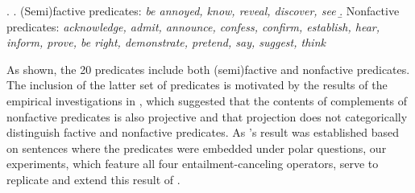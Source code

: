 \documentclass[a4paper,12pt,twoside]{article}
\newcommand{\poscite}[1]{\citeauthor{#1}'s \citeyear{#1}}
\begin{document}
    \ex. \label{ex:predicates}
    		\a. (Semi)factive predicates: {\em be annoyed, know, reveal, discover, see}
      \b. Nonfactive predicates: {\em acknowledge, admit, announce, confess, confirm, establish, hear, inform, prove, be right, demonstrate, pretend, say, suggest, think}
    
    As shown, the  20 predicates include both (semi)factive and nonfactive predicates. The inclusion of the latter set of predicates is motivated by the results of the empirical investigations in \citealt{degen_are_2022}, which suggested that the contents of complements of nonfactive predicates is also projective and that projection does not categorically distinguish factive and nonfactive predicates. As \poscite{degen_are_2022} result was established based on sentences where the predicates were embedded under polar questions, our experiments, which feature all four entailment-canceling operators, serve to replicate and extend this result of \citealt{degen_are_2022}.


	
\end{document}
